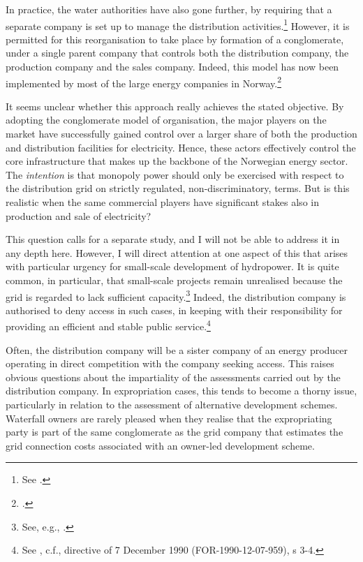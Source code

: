 In practice, the water authorities have also gone further, by requiring that a separate company is set up to manage the distribution activities.\footnote{See \cite[581-582]{bibow03}.} However, it is permitted for this reorganisation to take place by formation of a conglomerate, under a single parent company that controls both the distribution company, the production company and the sales company. Indeed, this model has now been implemented by most of the large energy companies in Norway.\footcite[582]{bibow03}

It seems unclear whether this approach really achieves the stated objective. By adopting the conglomerate model of organisation, the major players on the market have successfully gained control over a larger share of both the production and distribution facilities for electricity. Hence, these actors effectively control the core infrastructure that makes up the backbone of the Norwegian energy sector. The {\it intention} is that monopoly power should only be exercised with respect to the distribution grid on strictly regulated, non-discriminatory, terms. But is this realistic when the same commercial players have significant stakes also in production and sale of electricity?

This question calls for a separate study, and I will not be able to address it in any depth here. However, I will direct attention at one aspect of this that arises with particular urgency for small-scale development of hydropower. It is quite common, in particular, that small-scale projects remain unrealised because the grid is regarded to lack sufficient capacity.\footnote{See, e.g., \cite[84,161-162]{nou129}.} Indeed, the distribution company is authorised to deny access in such cases, in keeping with their responsibility for providing an efficient and stable public service.\footnote{See \cite[3-4]{ea90}, c.f., directive of 7 December 1990 (FOR-1990-12-07-959), s 3-4.}

Often, the distribution company will be a sister company of an energy producer operating in direct competition with the company seeking access. This raises obvious questions about the impartiality of the assessments carried out by the distribution company. In expropriation cases, this tends to become a thorny issue, particularly in relation to the assessment of alternative development schemes. Waterfall owners are rarely pleased when they realise that the expropriating party is part of the same conglomerate as the grid company that estimates the grid connection costs associated with an owner-led development scheme. 

